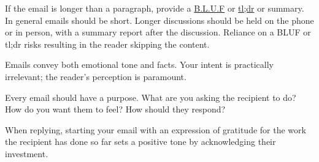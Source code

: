 If the email is longer than a paragraph, provide a \href{https://en.wikipedia.org/wiki/BLUF_(communication)}{B.L.U.F} or \href{https://en.wikipedia.org/wiki/Wikipedia:Too_long;_didn\%27t_read}{tl;dr} or summary. In general emails should be short. Longer discussions should be held on the phone or in person, with a summary report after the discussion. Reliance on a BLUF or tl;dr risks resulting in the reader skipping the content. 

Emails convey both emotional tone and facts. Your intent is practically irrelevant; the reader's perception is paramount. 

Every email should have a purpose. What are you asking the recipient to do? How do you want them to feel? How should they respond?

When replying, starting your email with an expression of gratitude for the work the recipient has done so far sets a positive tone by acknowledging their investment.

